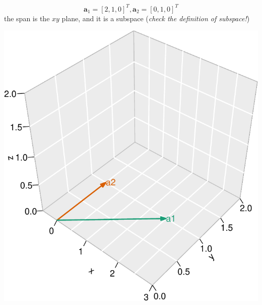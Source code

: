 \documentclass[ignorenonframetext,]{beamer}
\newcommand{\vv}[1]{\boldsymbol{#1}}
\begin{document}
\begin{frame}{}
\protect\hypertarget{section-2}{}

\[\vv{a}_1 =[2,1,0]^T, \vv{a}_2=[0,1,0]^T\] the span is the \(xy\)
plane, and it is a subspace (\emph{check the definition of subspace!})

\begin{center}\includegraphics[width=0.5\linewidth]{math4ml_files/figure-beamer/unnamed-chunk-8-1} \end{center}

\end{frame}
\end{document}
